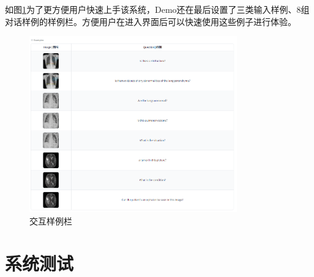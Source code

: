 如图\ref{demo_example}为了更方便用户快速上手该系统，Demo还在最后设置了三类输入样例、8组对话样例的样例栏。方便用户在进入界面后可以快速使用这些例子进行体验。
\begin{figure}[htbp]
	\centering	
	\includegraphics[width=0.8\textwidth]{Fig/myfig/chapter5/demo_example.png}  %
	\caption{\label{demo_example}交互样例栏} 
\end{figure}

\section{系统测试}
